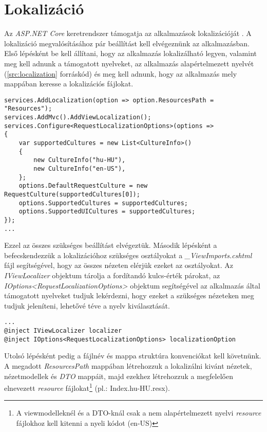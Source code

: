 \section{Lokalizáció}
\label{sec:localization}
Az \emph{ASP.NET Core} keretrendszer támogatja az alkalmazások lokalizációját \cite{Localization}. A lokalizáció megvalósításához pár beállítást kell elvégeznünk az alkalmazásban. Első lépésként be kell állítani, hogy az alkalmazás lokalizálható legyen, valamint meg kell adnunk a támogatott nyelveket, az alkalmazás alapértelmezett nyelvét (\ref{src:localization} forráskód) és meg kell adnunk, hogy az alkalmazás mely mappában keresse a lokalizációs fájlokat.
\begin{lstlisting}[language={[Sharp]C}]
services.AddLocalization(option => option.ResourcesPath = "Resources");
services.AddMvc().AddViewLocalization();
services.Configure<RequestLocalizationOptions>(options =>
{
	var supportedCultures = new List<CultureInfo>()
	{
		new CultureInfo("hu-HU"),
		new CultureInfo("en-US"),
	};
	options.DefaultRequestCulture = new RequestCulture(supportedCultures[0]);
	options.SupportedCultures = supportedCultures;
	options.SupportedUICultures = supportedCultures;
});
...
\end{lstlisting}
Ezzel az összes szükséges beállítást elvégeztük. Második lépésként a befecskendezzük a lokalizációhoz szükséges osztályokat a \emph{\_ViewImports.cshtml} fájl segítségével, hogy az összes nézeten elérjük ezeket az osztályokat. Az \emph{IViewLocalizer} objektum tárolja a fordítandó kulcs-érték párokat, az \emph{IOptions<RequestLocalizationOptions>} objektum segítségével az alkalmazás által támogatott nyelveket tudjuk lekérdezni, hogy ezeket a szükséges nézeteken meg tudjuk jeleníteni, lehetővé téve a nyelv kiválasztását.
\begin{lstlisting}[language={[Sharp]C}]
...
@inject IViewLocalizer localizer
@inject IOptions<RequestLocalizationOptions> localizationOption
\end{lstlisting}
Utolsó lépésként pedig a fájlnév és mappa struktúra konvenciókat kell követnünk. A megadott \emph{ResourcesPath} mappában létrehozzuk a lokalizálni kivánt nézetek, nézetmodellek és \emph{DTO} mappáit, majd ezekhez létrehozzuk a megfelelően elnevezett \emph{resource} fájlokat\footnote{A viewmodelleknél és a DTO-knál csak a nem alapértelmezett nyelvi \emph{resource} fájlokhoz kell kitenni a nyeli kódot (en-US)} (pl.: Index.hu-HU.resx).
